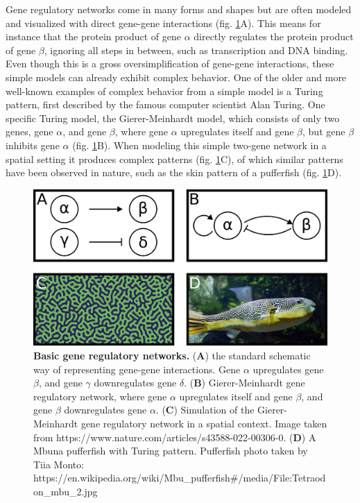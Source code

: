 Gene regulatory networks come in many forms and shapes but are often modeled and visualized with direct gene-gene interactions (fig. \ref{fig:network}A). This means for instance that the protein product of gene $\alpha$ directly regulates the protein product of gene $\beta$, ignoring all steps in between, such as transcription and DNA binding. Even though this is a gross oversimplification of gene-gene interactions, these simple models can already exhibit complex behavior. One of the older and more well-known examples of complex behavior from a simple model is a Turing pattern, first described by the famous computer scientist Alan Turing\cite{Turing1952}. One specific Turing model, the Gierer-Meinhardt model, which consists of only two genes, gene $\alpha$, and gene $\beta$, where gene $\alpha$ upregulates itself and gene $\beta$, but gene $\beta$ inhibits gene $\alpha$ (fig. \ref{fig:network}B). When modeling this simple two-gene network in a spatial setting it produces complex patterns (fig. \ref{fig:network}C), of which similar patterns have been observed in nature, such as the skin pattern of a pufferfish (fig. \ref{fig:network}D).

\begin{figure}[H]
    \center
    \includegraphics[width=0.8\linewidth]{ch.introduction/imgs/network.png}
    \caption{\textbf{Basic gene regulatory networks.} (\textbf{A}) the standard schematic way of representing gene-gene interactions. Gene $\alpha$ upregulates gene $\beta$, and gene $\gamma$ downregulates gene $\delta$. (\textbf{B}) Gierer-Meinhardt gene regulatory network, where gene $\alpha$ upregulates itself and gene $\beta$, and gene $\beta$ downregulates gene $\alpha$. (\textbf{C}) Simulation of the Gierer-Meinhardt gene regulatory network in a spatial context. Image taken from https://www.nature.com/articles/s43588-022-00306-0. (\textbf{D}) A Mbuna pufferfish with Turing pattern. Pufferfish photo taken by Tiia Monto: https://en.wikipedia.org/wiki/Mbu\_pufferfish\#/media/File:Tetraodon\_mbu\_2.jpg}
    \label{fig:network}
\end{figure}

